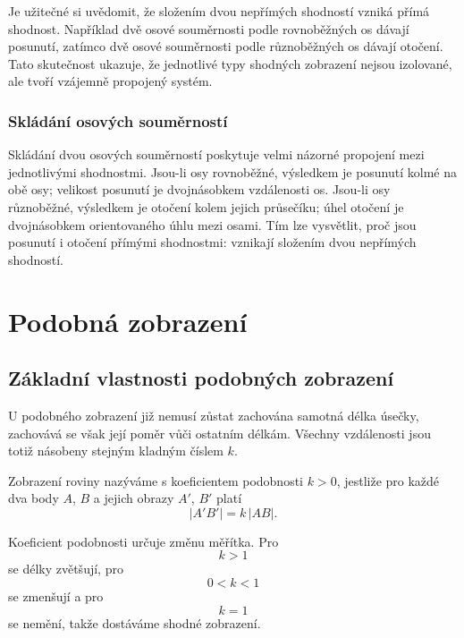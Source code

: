\documentclass[12pt,a4paper]{article}
\begin{document}
Je užitečné si uvědomit, že složením dvou nepřímých shodností vzniká přímá shodnost. Například dvě osové souměrnosti podle rovnoběžných os dávají posunutí, zatímco dvě osové souměrnosti podle různoběžných os dávají otočení. Tato skutečnost ukazuje, že jednotlivé typy shodných zobrazení nejsou izolované, ale tvoří vzájemně propojený systém.

\subsubsection*{Skládání osových souměrností}

Skládání dvou osových souměrností poskytuje velmi názorné propojení mezi jednotlivými shodnostmi. Jsou-li osy rovnoběžné, výsledkem je posunutí kolmé na obě osy; velikost posunutí je dvojnásobkem vzdálenosti os. Jsou-li osy různoběžné, výsledkem je otočení kolem jejich průsečíku; úhel otočení je dvojnásobkem orientovaného úhlu mezi osami. Tím lze vysvětlit, proč jsou posunutí i otočení přímými shodnostmi: vznikají složením dvou nepřímých shodností.




\section{Podobná zobrazení}

\subsection{Základní vlastnosti podobných zobrazení}

U podobného zobrazení již nemusí zůstat zachována samotná délka úsečky, zachovává se však její poměr vůči ostatním délkám. Všechny vzdálenosti jsou totiž násobeny stejným kladným číslem $k$.

\begin{definitionbox}
    Zobrazení roviny nazýváme  s koeficientem podobnosti $k>0$, jestliže pro každé dva body $A$, $B$ a jejich obrazy $A'$, $B'$ platí
    \[
        |A'B'|=k\,|AB|.
    \]
\end{definitionbox}

Koeficient podobnosti určuje změnu měřítka. Pro
\[
    k>1
\]
se délky zvětšují, pro
\[
    0<k<1
\]
se zmenšují a pro
\[
    k=1
\]
se nemění, takže dostáváme shodné zobrazení.
\end{document}
